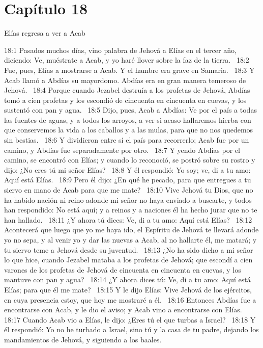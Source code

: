 \section*{Capítulo 18}
Elías regresa a ver a Acab  

18:1 Pasados muchos días, vino palabra de Jehová a Elías en el tercer año, diciendo: Ve, muéstrate a Acab, y yo haré llover sobre la faz de la tierra.  
18:2 Fue, pues, Elías a mostrarse a Acab. Y el hambre era grave en Samaria.  
18:3 Y Acab llamó a Abdías su mayordomo. Abdías era en gran manera temeroso de Jehová.  
18:4 Porque cuando Jezabel destruía a los profetas de Jehová, Abdías tomó a cien profetas y los escondió de cincuenta en cincuenta en cuevas, y los sustentó con pan y agua.  
18:5 Dijo, pues, Acab a Abdías: Ve por el país a todas las fuentes de aguas, y a todos los arroyos, a ver si acaso hallaremos hierba con que conservemos la vida a los caballos y a las mulas, para que no nos quedemos sin bestias.  
18:6 Y dividieron entre sí el país para recorrerlo; Acab fue por un camino, y Abdías fue separadamente por otro.  
18:7 Y yendo Abdías por el camino, se encontró con Elías; y cuando lo reconoció, se postró sobre su rostro y dijo: ¿No eres tú mi señor Elías?  
18:8 Y él respondió: Yo soy; ve, di a tu amo: Aquí está Elías.  
18:9 Pero él dijo: ¿En qué he pecado, para que entregues a tu siervo en mano de Acab para que me mate?  
18:10 Vive Jehová tu Dios, que no ha habido nación ni reino adonde mi señor no haya enviado a buscarte, y todos han respondido: No está aquí; y a reinos y a naciones él ha hecho jurar que no te han hallado.  
18:11 ¿Y ahora tú dices: Ve, di a tu amo: Aquí está Elías?  
18:12 Acontecerá que luego que yo me haya ido, el Espíritu de Jehová te llevará adonde yo no sepa, y al venir yo y dar las nuevas a Acab, al no hallarte él, me matará; y tu siervo teme a Jehová desde su juventud.  
18:13 ¿No ha sido dicho a mi señor lo que hice, cuando Jezabel mataba a los profetas de Jehová; que escondí a cien varones de los profetas de Jehová de cincuenta en cincuenta en cuevas, y los mantuve con pan y agua?  
18:14 ¿Y ahora dices tú: Ve, di a tu amo: Aquí está Elías; para que él me mate?  
18:15 Y le dijo Elías: Vive Jehová de los ejércitos, en cuya presencia estoy, que hoy me mostraré a él.  
18:16 Entonces Abdías fue a encontrarse con Acab, y le dio el aviso; y Acab vino a encontrarse con Elías.  
18:17 Cuando Acab vio a Elías, le dijo: ¿Eres tú el que turbas a Israel?  
18:18 Y él respondió: Yo no he turbado a Israel, sino tú y la casa de tu padre, dejando los mandamientos de Jehová, y siguiendo a los baales.  
